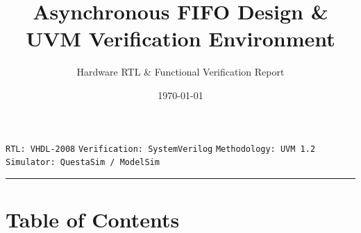 \documentclass[
]{article}
\title{\Huge\textbf{Asynchronous FIFO Design \& UVM Verification Environment}}
\author{\large Hardware RTL \& Functional Verification Report}
\date{\today}
\begin{document}
\maketitle

\begin{center}
\vspace{-0.5em}
\colorbox{gray!10}{\small\texttt{RTL: VHDL-2008}} \quad
\colorbox{gray!10}{\small\texttt{Verification: SystemVerilog}} \quad
\colorbox{gray!10}{\small\texttt{Methodology: UVM 1.2}} \quad
\colorbox{gray!10}{\small\texttt{Simulator: QuestaSim / ModelSim}}
\vspace{1.0em}
\end{center}

\begin{center}\rule{0.8\linewidth}{0.5pt}\end{center}

\section{Table of Contents}\label{table-of-contents}
\end{document}
